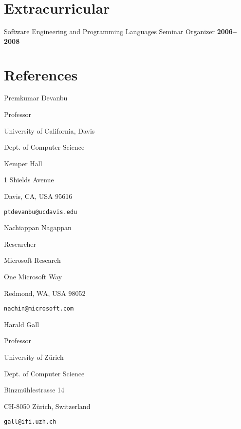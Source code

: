 \documentclass[margin,line,article]{res}
\newenvironment{list1}{
  \begin{list}{}{%
      \setlength{\itemsep}{0in}
      \setlength{\parsep}{0in} \setlength{\parskip}{0in}
      \setlength{\topsep}{0in} \setlength{\partopsep}{0in} 
      \setlength{\leftmargin}{0.17in}}}{\end{list}}
\newenvironment{list2}{
  \begin{list}{$\bullet$}{%
      \setlength{\itemsep}{0in}
      \setlength{\parsep}{0in} \setlength{\parskip}{0in}
      \setlength{\topsep}{0in} \setlength{\partopsep}{0in} 
      \setlength{\leftmargin}{0.2in}}}{\end{list}}
\begin{document}
\begin{resume}
\begin{comment}
I don't think anyone cares about this
\section{Technical Skills} 
\begin{list2}
\item Proficient:  C, Java, Python, C++, PostgreSQL, MySQL, Ruby, R, \LaTeX
\item Familiar: Lisp, Prolog, C\#, SML
\end{list2}
\end{comment}

\section{Extracurricular}
Software Engineering and Programming Languages Seminar Organizer \hfill \textbf{2006--2008}

\section{References}

Premkumar Devanbu
\begin{list1}
\item Professor
\item University of California, Davis
\item Dept. of Computer Science
\item Kemper Hall
\item 1 Shields Avenue
\item Davis, CA, USA 95616
\item \texttt{ptdevanbu@ucdavis.edu}
\end{list1}

Nachiappan Nagappan
\begin{list1}
\item Researcher
\item Microsoft Research
\item One Microsoft Way
\item Redmond, WA, USA 98052
\item \texttt{nachin@microsoft.com}
\end{list1}

Harald Gall
\begin{list1}
\item Professor
\item University of Z\"urich
\item Dept. of Computer Science
\item Binzm\"uhlestrasse 14
\item CH-8050 Z\"urich, Switzerland
\item \texttt{gall@ifi.uzh.ch}
\end{list1}


\end{resume}
\end{document}
